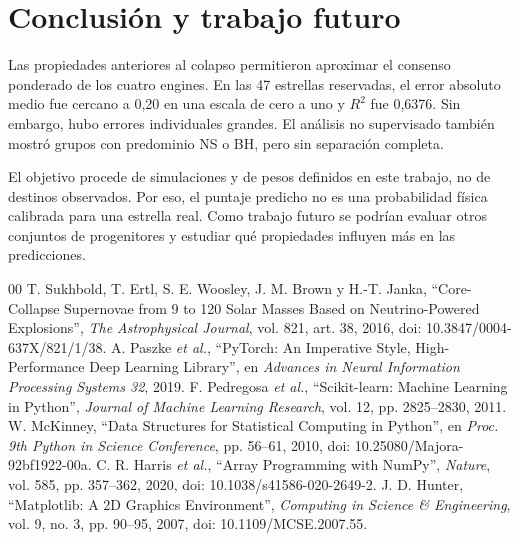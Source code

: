 \documentclass[conference,a4paper]{IEEEtran}
\begin{document}
\section{Conclusión y trabajo futuro}
Las propiedades anteriores al colapso permitieron aproximar el consenso ponderado de los cuatro engines. En las 47 estrellas reservadas, el error absoluto medio fue cercano a 0,20 en una escala de cero a uno y $R^2$ fue 0,6376. Sin embargo, hubo errores individuales grandes. El análisis no supervisado también mostró grupos con predominio NS o BH, pero sin separación completa.

El objetivo procede de simulaciones y de pesos definidos en este trabajo, no de destinos observados. Por eso, el puntaje predicho no es una probabilidad física calibrada para una estrella real. Como trabajo futuro se podrían evaluar otros conjuntos de progenitores y estudiar qué propiedades influyen más en las predicciones.

\begin{thebibliography}{00}
 T. Sukhbold, T. Ertl, S. E. Woosley, J. M. Brown y H.-T. Janka, ``Core-Collapse Supernovae from 9 to 120 Solar Masses Based on Neutrino-Powered Explosions'', \emph{The Astrophysical Journal}, vol. 821, art. 38, 2016, doi: 10.3847/0004-637X/821/1/38.
 A. Paszke \emph{et al.}, ``PyTorch: An Imperative Style, High-Performance Deep Learning Library'', en \emph{Advances in Neural Information Processing Systems 32}, 2019.
 F. Pedregosa \emph{et al.}, ``Scikit-learn: Machine Learning in Python'', \emph{Journal of Machine Learning Research}, vol. 12, pp. 2825--2830, 2011.
 W. McKinney, ``Data Structures for Statistical Computing in Python'', en \emph{Proc. 9th Python in Science Conference}, pp. 56--61, 2010, doi: 10.25080/Majora-92bf1922-00a.
 C. R. Harris \emph{et al.}, ``Array Programming with NumPy'', \emph{Nature}, vol. 585, pp. 357--362, 2020, doi: 10.1038/s41586-020-2649-2.
 J. D. Hunter, ``Matplotlib: A 2D Graphics Environment'', \emph{Computing in Science \& Engineering}, vol. 9, no. 3, pp. 90--95, 2007, doi: 10.1109/MCSE.2007.55.
\end{thebibliography}
\end{document}
